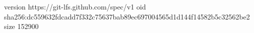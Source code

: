 version https://git-lfs.github.com/spec/v1
oid sha256:dc559632fdcadd7f332c75637bab89ec697004565d1d144f14582b5c32562be2
size 152900
